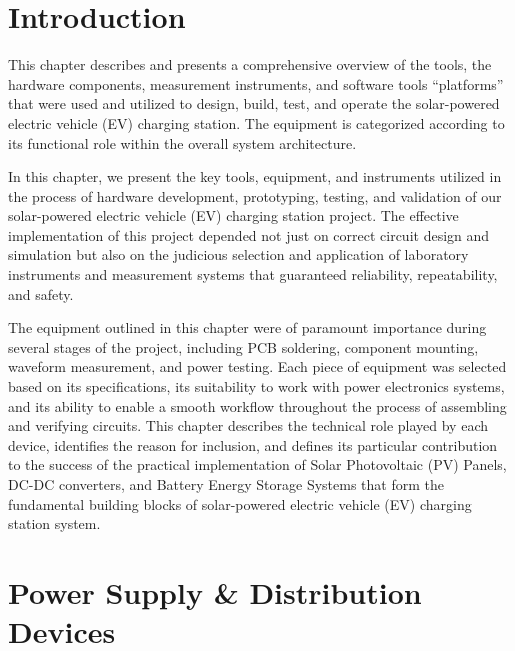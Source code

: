 
\section{Introduction}
This chapter describes and presents a comprehensive overview of the tools, the hardware components, measurement instruments, and software tools ``platforms'' that were used and utilized to design, build, test, and operate the solar-powered electric vehicle (EV) charging station. The equipment is categorized according to its functional role within the overall system architecture.

In this chapter, we present the key tools, equipment, and instruments utilized in the process of hardware development, prototyping, testing, and validation of our solar-powered electric vehicle (EV) charging station project. The effective implementation of this project depended not just on correct circuit design and simulation but also on the judicious selection and application of laboratory instruments and measurement systems that guaranteed reliability, repeatability, and safety.

The equipment outlined in this chapter were of paramount importance during several stages of the project, including PCB soldering, component mounting, waveform measurement, and power testing. Each piece of equipment was selected based on its specifications, its suitability to work with power electronics systems, and its ability to enable a smooth workflow throughout the process of assembling and verifying circuits. This chapter describes the technical role played by each device, identifies the reason for inclusion, and defines its particular contribution to the success of the practical implementation of Solar Photovoltaic (PV) Panels, DC-DC converters, and Battery Energy Storage Systems that form the fundamental building blocks of solar-powered electric vehicle (EV) charging station system.

\section{Power Supply \& Distribution Devices}

